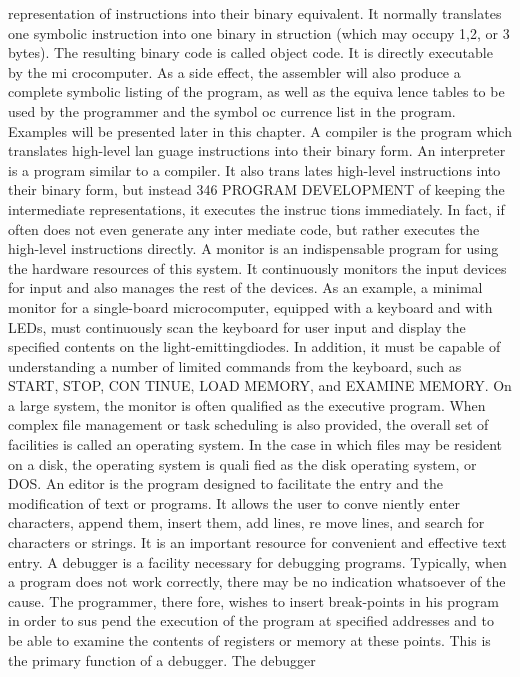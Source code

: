 \documentclass{book}
\begin{document}
{{{{{{{{{{{{{{{{{{{{{{{{{{{{{{{{{{{{{{{{{{{{{{{{{{{{{{{{{{{{{{{{{{{{{{{{{{{{{{{{{{{{{{{{{{{{{{{{{{{{{{{{{{{{{{{{{{{{{{{{{{{{{{{{{{{{{{{{{{{{representation of instructions into their binary equivalent. It
normally translates one symbolic instruction into one binary in
struction (which may occupy 1,2, or 3 bytes). The resulting binary
code is called object code. It is directly executable by the mi
crocomputer. As a side effect, the assembler will also produce a
complete symbolic listing of the program, as well as the equiva
lence tables to be used by the programmer and the symbol oc
currence list in the program. Examples will be presented later in
this chapter.
A compiler is the program which translates high-level lan
guage instructions into their binary form.
An interpreter is a program similar to a compiler. It also trans
lates high-level instructions into their binary form, but instead
346
PROGRAM DEVELOPMENT
of keeping the intermediate representations, it executes the instruc
tions immediately. In fact, if often does not even generate any inter
mediate code, but rather executes the high-level instructions directly.
A monitor is an indispensable program for using the hardware
resources of this system. It continuously monitors the input devices
for input and also manages the rest of the devices. As an example,
a minimal monitor for a single-board microcomputer, equipped with
a keyboard and with LEDs, must continuously scan the keyboard for
user input and display the specified contents on the light-emittingdiodes.
In addition, it must be capable of understanding a number of
limited commands from the keyboard, such as START, STOP, CON
TINUE, LOAD MEMORY, and EXAMINE MEMORY. On a large
system, the monitor is often qualified as the executive program. When
complex file management or task scheduling is also provided, the
overall set of facilities is called an operating system. In the case in
which files may be resident on a disk, the operating system is quali
fied as the disk operating system, or DOS.
An editor is the program designed to facilitate the entry and
the modification of text or programs. It allows the user to conve
niently enter characters, append them, insert them, add lines, re
move lines, and search for characters or strings. It is an important
resource for convenient and effective text entry.
A debugger is a facility necessary for debugging programs.
Typically, when a program does not work correctly, there may
be no indication whatsoever of the cause. The programmer, there
fore, wishes to insert break-points in his program in order to sus
pend the execution of the program at specified addresses and to
be able to examine the contents of registers or memory at these
points. This is the primary function of a debugger. The debugger
}}}}}}}}}}}}}}}}}}}}}}}}}}}}}}}}}}}}}}}}}}}}}}}}}}}}}}}}}}}}}}}}}}}}}}}}}}}}}}}}}}}}}}}}}}}}}}}}}}}}}}}}}}}}}}}}}}}}}}}}}}}}}}}}}}}}}}}}}}}}
\end{document}

